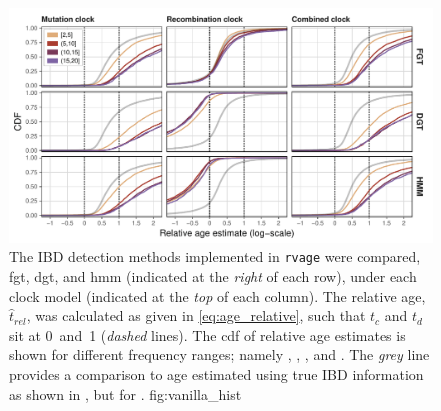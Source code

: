

\begin{figure}[!htb]
\vspace{10mm}
\includegraphics[width=\textwidth]{./img/ch5/vanilla_hist}
{The  IBD detection methods implemented in \texttt{rvage} were compared, \ie \gls{fgt}, \gls{dgt}, and \gls{hmm} (indicated at the \emph{right} of each row), under each clock model (indicated at the \emph{top} of each column).
The relative age, ${\hat{t}_\textit{rel}}$, was calculated as given in \cref{eq:age_relative}, such that $t_c$ and $t_d$ sit at 0~and~1 (\emph{dashed} lines).
The \gls{cdf} of relative age estimates is shown for different frequency ranges; namely \fk{[2,5]}, \fk{(5,10]}, \fk{(10,15]}, and \fk{(15,20]}.
The \emph{grey} line provides a comparison to age estimated using true IBD information as shown in , but for \fk{[2,20]}.}
{fig:vanilla_hist}
\end{figure}
